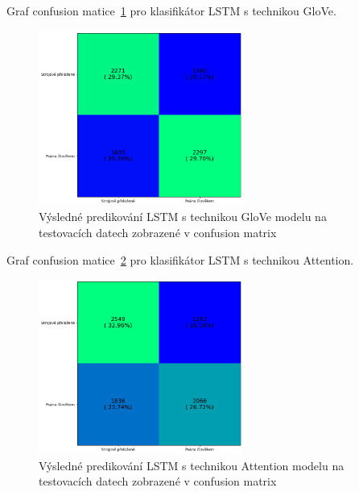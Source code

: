 Graf confusion matice~\ref{fig:MULTI LSTM GloVe model conf} pro klasifikátor LSTM s technikou GloVe.
\begin{figure}[H]
	\centering
	\includegraphics[width=0.6\textwidth]{Figures/MULTI_LSTM_GLOVE_conf.png}
	\caption{Výsledné predikování LSTM s technikou GloVe modelu na testovacích datech zobrazené v confusion matrix}\label{fig:MULTI LSTM GloVe model conf}
\end{figure}

Graf confusion matice~\ref{fig:MULTI LSTM Attention model conf} pro klasifikátor LSTM s technikou Attention.
\begin{figure}[H]
	\centering
	\includegraphics[width=0.6\textwidth]{Figures/MULTI_LSTM_Attention_conf.png}
	\caption{Výsledné predikování LSTM s technikou Attention modelu na testovacích datech zobrazené v confusion matrix}\label{fig:MULTI LSTM Attention model conf}
\end{figure}

